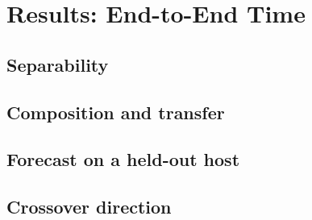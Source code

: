 \section{Results: End-to-End Time}
\label{sec:results-time}

\subsection{Separability}
\label{sec:res-h0}

\subsection{Composition and transfer}
\label{sec:res-h1}

\subsection{Forecast on a held-out host}
\label{sec:res-h3}

\subsection{Crossover direction}
\label{sec:res-h5}
